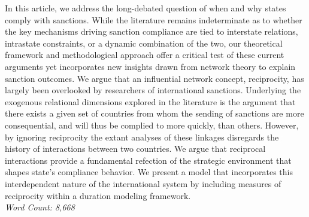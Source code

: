 In this article, we address the long-debated question of when and why states comply with sanctions. While the literature remains indeterminate as to whether the key mechanisms driving sanction compliance are tied to interstate relations, intrastate constraints, or a dynamic combination of the two, our theoretical framework and methodological approach offer a critical test of these current arguments yet incorporates new insights drawn from network theory to explain sanction outcomes. We argue that an influential network concept, reciprocity, has largely been overlooked by researchers of international sanctions. Underlying the exogenous
relational dimensions explored in the literature is the argument that there exists a given set of countries from whom the sending of sanctions are more consequential, and will thus be complied to more quickly, than others. However, by ignoring reciprocity the extant analyses of these linkages disregards the history of interactions between two countries. We argue that reciprocal interactions provide a fundamental refection of the strategic environment that shapes state's compliance behavior. We present a model that incorporates this interdependent nature of the international system by including measures of reciprocity within a duration modeling framework.\\

\noindent \textit{Word Count: 8,668}

